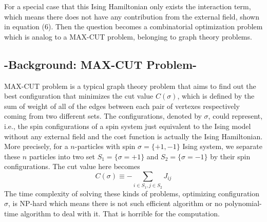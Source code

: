 \documentclass{turabian-researchpaper}
\begin{document}
        For a special case that this Ising Hamiltonian only exists the interaction term, which means there does not have any contribution from the external field, shown in equation (6). Then the question becomes a combinatorial optimization problem which is analog to a MAX-CUT problem, belonging to graph theory problems.
    \subsection{-Background: MAX-CUT Problem-}
        MAX-CUT problem is a typical graph theory problem that aims to find out the best configuration that minimizes the cut value $C(\sigma)$, which is defined by the sum of weight of all of the edges between each pair of vertexes respectively coming from two different sets. The configurations, denoted by $\sigma$, could represent, i.e., the spin configurations of a spin system just equivalent to the Ising model without any external field and the cost function is actually the Ising Hamiltonian. More precisely, for a $n$-particles with spin $\sigma = \{+1,-1\}$ Ising system, we separate these $n$ particles into two set $S_1 = \{\sigma = +1\}$ and $S_2 = \{\sigma = -1\}$ by their spin configurations. The cut value here becomes
            \begin{equation}
                C(\sigma) \equiv -\sum_{i\in S_1,j\in S_2}J_{ij}
            \end{equation}
        The time complexity of solving these kinds of problems, optimizing configuration $\sigma$, is NP-hard which means there is not such efficient algorithm or no polynomial-time algorithm to deal with it\cite{2016incoherent}. That is horrible for the computation.
\end{document}
